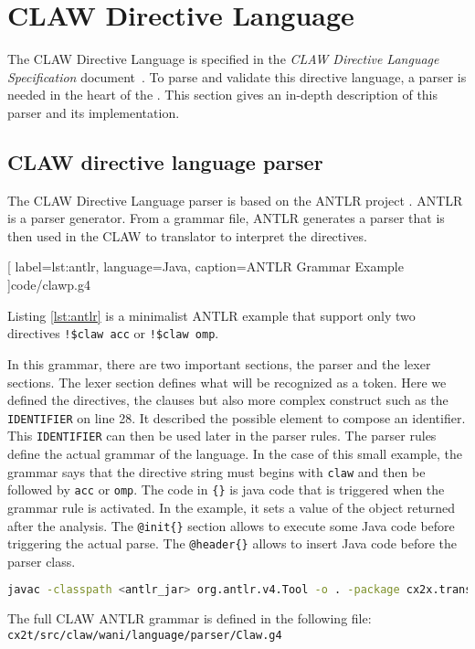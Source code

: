 \chapter{CLAW Directive Language}
The CLAW Directive Language is specified in the \textit{CLAW Directive Language
Specification} document~\cite{claw:specification}. To parse and validate 
this directive language, a parser is needed in the heart of the \clawfcomp. 
This section gives an in-depth description of this parser and its 
implementation.

\section{CLAW directive language parser}
The CLAW Directive Language parser is based on the ANTLR project
\cite{Parr:2013:DAR:2501720}. ANTLR is a parser generator. From a grammar file,
ANTLR generates a parser that is then used in the CLAW \xcodemlf to \xcodeml
translator to interpret the directives.


  [
    label=lst:antlr,
    language=Java,
    caption=ANTLR Grammar Example
  ]{code/clawp.g4}

Listing \ref{lst:antlr} is a minimalist ANTLR example that support only two
directives \lstinline|!$claw acc| or \lstinline|!$claw omp|.

In this grammar, there are two important sections, the parser and the lexer
sections. The lexer section defines what will be recognized as a token. Here
we defined the directives, the clauses but also more complex construct such as
the \lstinline|IDENTIFIER| on line 28. It described the possible element to
compose an identifier. This \lstinline|IDENTIFIER| can then be used later in
the parser rules.
The parser rules define the actual grammar of the language. In the case
of this small example, the grammar says that the directive string must begins
with \lstinline|claw| and then be followed by \lstinline|acc| or
\lstinline|omp|. The code in \lstinline|{}| is java code that is triggered
when the grammar rule is activated. In the example, it sets a value of the
object returned after the analysis.
The \lstinline|@init{}| section allows to execute some Java code before
triggering the actual parse. The \lstinline|@header{}| allows to insert Java
code before the parser class.

\begin{lstlisting}[label=lst:antlr_cmd, 
  caption=ANTLR parser generation command, language=bash]
javac -classpath <antlr_jar> org.antlr.v4.Tool -o . -package cx2x.translator.language.parser Claw.g4
\end{lstlisting}

The full CLAW ANTLR grammar is defined in the following file:
\lstinline|cx2t/src/claw/wani/language/parser/Claw.g4|
